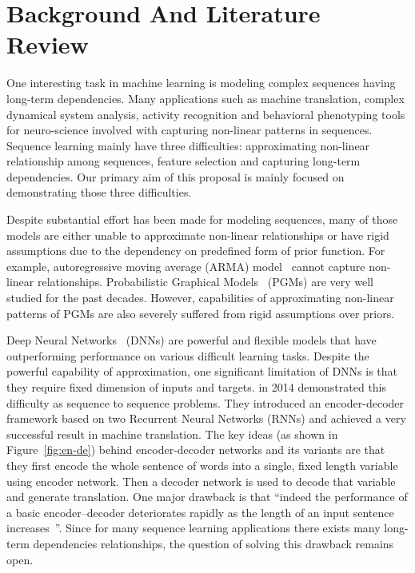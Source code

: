 \message{ !name(usyd_phd_proposal.tex)}\documentclass{article} \usepackage{tabularx}
\renewcommand{\citename}{\citet} \renewcommand{\cite}{\citep}
\begin{document}
\section{Background And Literature Review}
\label{sec:intro}

One interesting task in machine learning is modeling complex
sequences having long-term dependencies. Many applications such
as machine translation, complex dynamical system analysis,
activity recognition and behavioral phenotyping tools for
neuro-science involved with capturing non-linear patterns in
sequences. Sequence learning mainly have three difficulties:
approximating non-linear relationship among sequences, feature
selection and capturing long-term dependencies. Our primary aim
of this proposal is mainly focused on demonstrating those three
difficulties. 

Despite substantial effort has been made for modeling sequences,
many of those models are either unable to approximate non-linear
relationships or have rigid assumptions due to the dependency on
predefined form of prior function. For example, autoregressive
moving average (ARMA) model~\cite{hibon1997arma} cannot capture
non-linear relationships. Probabilistic Graphical
Models~\cite{murphy2012machine,koller2009probabilistic} (PGMs)
are very well studied for the past decades. However, capabilities
of approximating non-linear patterns of PGMs are also severely
suffered from rigid assumptions over priors.

Deep Neural Networks~\cite{goodfellow2016deep} (DNNs) are
powerful and flexible models that have outperforming performance
on various difficult learning tasks. Despite the powerful
capability of approximation, one significant limitation of DNNs
is that they require fixed dimension of inputs and targets.
\citename{sutskever2014sequence} in 2014 demonstrated this
difficulty as sequence to sequence problems. They introduced an
encoder-decoder framework based on two Recurrent Neural Networks
(RNNs) and achieved a very successful result in machine
translation. The key ideas (as shown in Figure~\ref{fig:en-de})
behind encoder-decoder networks and its variants are that they
first encode the whole sentence of words into a single, fixed
length variable using encoder network. Then a decoder network is
used to decode that variable and generate translation. One major
drawback is that ``indeed the performance of a basic
encoder–decoder deteriorates rapidly as the length of an input
sentence increases~\cite{attention}''. Since for many sequence
learning applications there exists many long-term dependencies
relationships, the question of solving this drawback remains
open.
\end{document}
